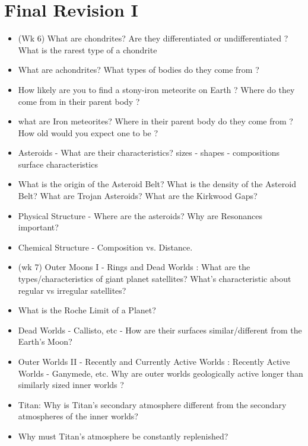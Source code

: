 \documentclass[paper=a4, fontsize=11pt]{scrartcl} %
\numberwithin{equation}{section} %
\begin{document}

\section{Final Revision I}


\begin{itemize}
\item (Wk 6)   What   are chondrites?  Are they differentiated or undifferentiated ? What is the rarest type of a chondrite 
\item What are achondrites?  What types of bodies do they come from  ? 

\item How  likely are you to find a stony-iron meteorite   on Earth ? Where do they come from in their parent body ? 

\item what are Iron meteorites?  Where in their parent body do they come from ? How old would you expect one to be ? 

\item Asteroids - What are their characteristics? sizes - shapes - compositions surface characteristics	
\item What is the origin of the Asteroid Belt?  What is the density of the Asteroid Belt? What are Trojan Asteroids?
What are the Kirkwood Gaps?
\item Physical Structure - Where are the asteroids? Why are Resonances important?
\item Chemical Structure - Composition vs. Distance.


\item (wk 7)  Outer Moons I - Rings and Dead Worlds  : What are the types/characteristics of giant planet satellites? What's characteristic about regular vs irregular satellites?  
\item What is the Roche Limit of a Planet? 
\item Dead Worlds - Callisto, etc  - How are their surfaces similar/different from the Earth's Moon?


\item Outer Worlds II - Recently and Currently Active Worlds : Recently Active Worlds - Ganymede, etc.
Why are outer worlds geologically active longer than similarly sized inner worlds ? 

\item Titan: Why is Titan's secondary atmosphere different from the secondary atmospheres of the inner worlds?
\item Why must Titan's atmosphere be constantly replenished? 


\end{itemize}
\end{document}
